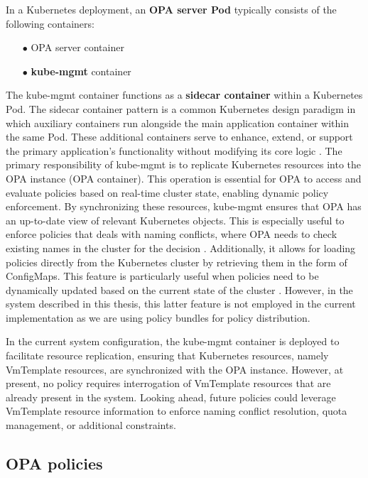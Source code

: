 In a Kubernetes deployment, an \textbf{OPA server Pod} typically consists of the following containers:
\begin{itemize}[itemsep=0.2pt, topsep=1pt]
  \item[$\bullet$] OPA server container
  \item[$\bullet$] \textbf{kube-mgmt} container \\
\end{itemize} 

The kube-mgmt container functions as a \textbf{sidecar container} within a Kubernetes Pod. The sidecar container pattern is a common Kubernetes design paradigm in which auxiliary containers run alongside the main application container within the same Pod. These additional containers serve to enhance, extend, or support the primary application's functionality without modifying its core logic \cite{sidecar_containers}. 
The primary responsibility of kube-mgmt is to replicate Kubernetes resources into the OPA instance (OPA container). This operation is essential for OPA to access and evaluate policies based on real-time cluster state, enabling dynamic policy enforcement. By synchronizing these resources, kube-mgmt ensures that OPA has an up-to-date view of relevant Kubernetes objects.
This is especially useful to enforce policies that deals with naming conflicts, where OPA needs to check existing names in the cluster for the decision \cite{kube-mgmt}.
Additionally, it allows for loading policies directly from the Kubernetes cluster by retrieving them in the form of ConfigMaps. This feature is particularly useful when policies need to be dynamically updated based on the current state of the cluster \cite{kube-mgmt}. However, in the system described in this thesis, this latter feature is not employed in the current implementation as we are using policy bundles for policy distribution.

In the current system configuration, the kube-mgmt container is deployed to facilitate resource replication, ensuring that Kubernetes resources, namely VmTemplate resources, are synchronized with the OPA instance. 
However, at present, no policy requires interrogation of VmTemplate resources that are already present in the system.
Looking ahead, future policies could leverage VmTemplate resource information to enforce naming conflict resolution, quota management, or additional constraints.

\subsection{OPA policies}
\label{sec:opa_policies}

